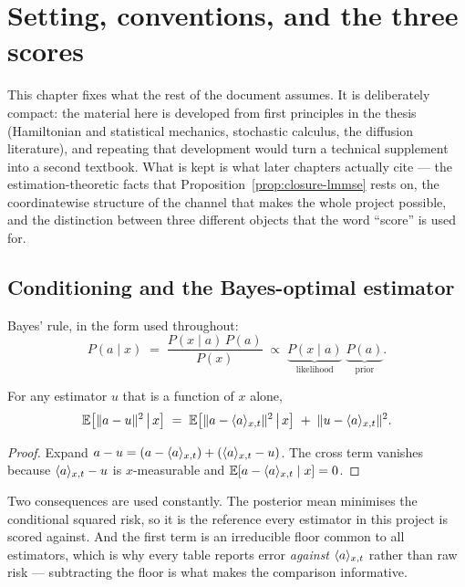\chapter{Setting, conventions, and the three scores}
\label{ch:probability}
\label{ch:diffusion}

This chapter fixes what the rest of the document assumes. It is deliberately compact: the
material here is developed from first principles in the thesis (Hamiltonian and statistical
mechanics, stochastic calculus, the diffusion literature), and repeating that development would
turn a technical supplement into a second textbook. What is kept is what later chapters actually
cite --- the estimation-theoretic facts that Proposition~\ref{prop:closure-lmmse} rests on, the
coordinatewise structure of the channel that makes the whole project possible, and the
distinction between three different objects that the word ``score'' is used for.

\section{Conditioning and the Bayes-optimal estimator}
\label{sec:bayesopt}

Bayes' rule, in the form used throughout:
\begin{equation}
\label{eq:bayes}
P(a \mid x) \;=\; \frac{P(x\mid a)\,P(a)}{P(x)} \;\propto\;
\underbrace{P(x\mid a)}_{\text{likelihood}}\;\underbrace{P(a)}_{\text{prior}} .
\end{equation}

\begin{proposition}
\label{prop:orthogonality}
For any estimator $u$ that is a function of $x$ alone,
\begin{equation}
\label{eq:orth}
\mathbb{E}\!\left[\|a-u\|^2 \,\middle|\, x\right]
\;=\;
\mathbb{E}\!\left[\|a-\langle a \rangle_{x,t}\|^2 \,\middle|\, x\right]
\;+\;
\|u-\langle a \rangle_{x,t}\|^2 .
\end{equation}
\end{proposition}

\begin{proof}
Expand $a-u = (a-\langle a \rangle_{x,t}) + (\langle a \rangle_{x,t}-u)$. The cross term vanishes because $\langle a \rangle_{x,t}-u$ is
$x$-measurable and $\mathbb{E}[a-\langle a \rangle_{x,t}\mid x]=0$.
\end{proof}

Two consequences are used constantly. The posterior mean minimises the conditional squared risk,
so it is the reference every estimator in this project is scored against. And the first term is
an irreducible floor common to all estimators, which is why every table reports error
\emph{against} $\langle a \rangle_{x,t}$ rather than raw risk --- subtracting the floor is what makes the
comparison informative.

